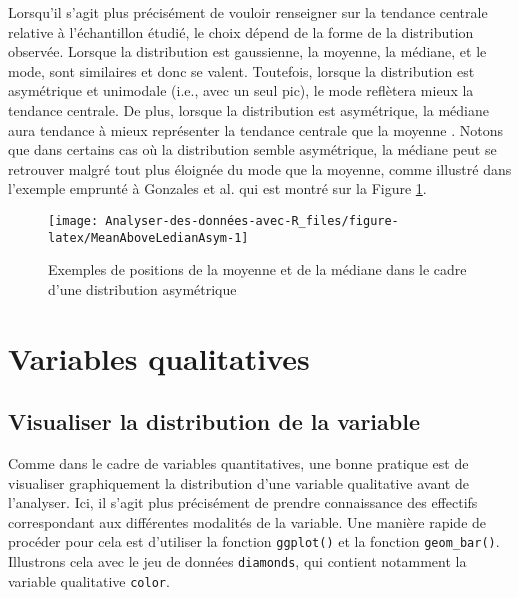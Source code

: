 \documentclass[
]{book}
\begin{document}
Lorsqu'il s'agit plus précisément de vouloir renseigner sur la tendance centrale relative à l'échantillon étudié, le choix dépend de la forme de la distribution observée. Lorsque la distribution est gaussienne, la moyenne, la médiane, et le mode, sont similaires et donc se valent. Toutefois, lorsque la distribution est asymétrique et unimodale (i.e., avec un seul pic), le mode reflètera mieux la tendance centrale. De plus, lorsque la distribution est asymétrique, la médiane aura tendance à mieux représenter la tendance centrale que la moyenne \autocite{rousseletReactionTimesOther2020}. Notons que dans certains cas où la distribution semble asymétrique, la médiane peut se retrouver malgré tout plus éloignée du mode que la moyenne, comme illustré dans l'exemple emprunté à Gonzales et al. \autocite*{gonzalesMeasuresCentralTendency2001} qui est montré sur la Figure \ref{fig:MeanAboveLedianAsym}.

\begin{figure}

{\centering \texttt{[image: Analyser-des-données-avec-R\_files/figure-latex/MeanAboveLedianAsym-1]} 

}

\caption{Exemples de positions de la moyenne et de la médiane dans le cadre d'une distribution asymétrique}\label{fig:MeanAboveLedianAsym}
\end{figure}

\hypertarget{variables-qualitatives}{%
\section{Variables qualitatives}\label{variables-qualitatives}}

\hypertarget{visualiser-la-distribution-de-la-variable-1}{%
\subsection{Visualiser la distribution de la variable}\label{visualiser-la-distribution-de-la-variable-1}}

Comme dans le cadre de variables quantitatives, une bonne pratique est de visualiser graphiquement la distribution d'une variable qualitative avant de l'analyser. Ici, il s'agit plus précisément de prendre connaissance des effectifs correspondant aux différentes modalités de la variable. Une manière rapide de procéder pour cela est d'utiliser la fonction \texttt{ggplot()} et la fonction \texttt{geom\_bar()}. Illustrons cela avec le jeu de données \texttt{diamonds}, qui contient notamment la variable qualitative \texttt{color}.
\end{document}
